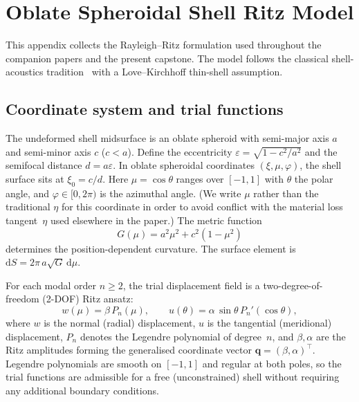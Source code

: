 
\appendix
\section{Oblate Spheroidal Shell Ritz Model}
\label{sec:appendix_ritz}

This appendix collects the Rayleigh--Ritz formulation used throughout the
companion papers and the present capstone.  The model follows the classical
shell-acoustics tradition~\cite{lamb1882,Junger1986} with a Love--Kirchhoff
thin-shell assumption.

\subsection{Coordinate system and trial functions}
\label{sec:appendix_coordinates}

The undeformed shell midsurface is an oblate spheroid with semi-major axis $a$
and semi-minor axis $c$ ($c < a$).  Define the eccentricity
$\varepsilon = \sqrt{1-c^2/a^2}$ and the semifocal distance
$d = a\varepsilon$.  In oblate spheroidal coordinates $(\xi,\mu,\varphi)$, the
shell surface sits at $\xi_0 = c/d$.  Here $\mu = \cos\theta$ ranges over
$[-1,1]$ with $\theta$ the polar angle, and $\varphi\in[0,2\pi)$ is the
azimuthal angle.  (We write $\mu$ rather than the traditional $\eta$ for this
coordinate in order to avoid conflict with the material loss tangent~$\eta$
used elsewhere in the paper.)  The metric function
\begin{equation}
  G(\mu) = a^2\mu^2 + c^2(1-\mu^2)
  \label{eq:app_metric}
\end{equation}
determines the position-dependent curvature.  The surface element is
$\mathrm{d}S = 2\pi\,a\sqrt{G}\,\mathrm{d}\mu$.

For each modal order $n\geq 2$, the trial displacement field
is a two-degree-of-freedom (2-DOF) Ritz ansatz:
\begin{equation}
  w(\mu) = \beta\,P_n(\mu), \qquad
  u(\theta) = \alpha\,\sin\theta\,P_n'(\cos\theta),
  \label{eq:app_trial}
\end{equation}
where $w$ is the normal (radial) displacement, $u$ is the tangential
(meridional) displacement, $P_n$ denotes the Legendre polynomial of degree~$n$,
and $\beta,\alpha$ are the Ritz amplitudes forming the generalised coordinate
vector $\mathbf{q}=(\beta,\alpha)^\top$.  Legendre polynomials are smooth
on $[-1,1]$ and regular at both poles, so the trial functions are admissible
for a free (unconstrained) shell without requiring any additional boundary
conditions.

